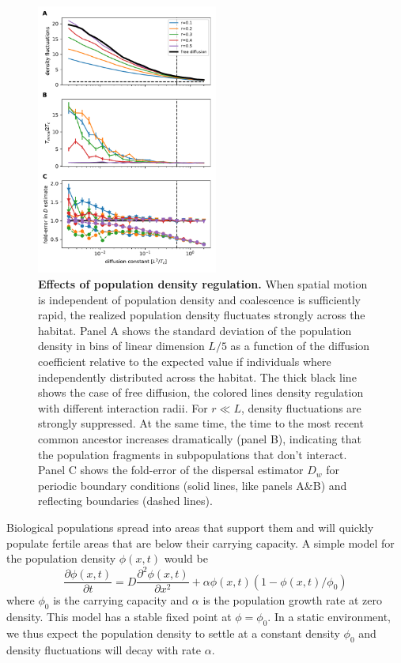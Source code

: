 \documentclass[aps,rmp, twocolumn]{revtex4}
\begin{document}
\begin{figure}
    \includegraphics[width=0.53\textwidth]{figures/stable_density}
    \caption{\label{fig:density_reg}  {\bf Effects of population density regulation.}
    When spatial motion is independent of population density and coalescence is sufficiently rapid, the realized population density fluctuates strongly across the habitat. Panel A shows the standard deviation of the population density in bins of linear dimension $L/5$ as a function of the diffusion coefficient relative to the expected value if individuals where independently distributed across the habitat. The thick black line shows the case of free diffusion, the colored lines density regulation with different interaction radii. For $r\ll L$, density fluctuations are strongly suppressed.
    At the same time, the time to the most recent common ancestor increases dramatically (panel B), indicating that the population fragments in subpopulations that don't interact.
    Panel C shows the fold-error of the dispersal estimator $D_w$ for periodic boundary conditions (solid lines, like panels A\&B) and reflecting boundaries (dashed lines).
    }
\end{figure}

Biological populations spread into areas that support them and will quickly populate fertile areas that are below their carrying capacity.
A simple model for the population density $\phi(x,t)$ would be
\begin{equation}
    \label{eq:FKPP}
    \frac{\partial \phi(x,t)}{\partial t} = D\frac{\partial^2 \phi(x,t)}{\partial x^2} + \alpha \phi(x,t)(1-\phi(x,t)/\phi_0)
\end{equation}
where $\phi_0$ is the carrying capacity and $\alpha$ is the population growth rate at zero density.
This model has a stable fixed point at $\phi=\phi_0$.
In a static environment, we thus expect the population density to settle at a constant density $\phi_0$ and density fluctuations will decay with rate $\alpha$.
\end{document}
